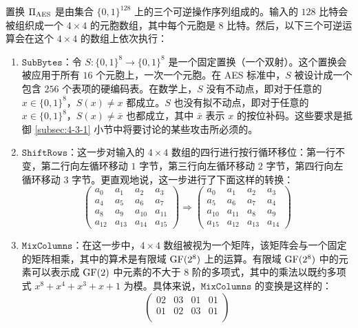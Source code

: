 \begin{snote}
置换 $\Pi_{\rm AES}$ 是由集合 $\{0,1\}^{128}$ 上的三个可逆操作序列组成的。输入的 $128$ 比特会被组织成一个 $4\times4$ 的元胞数组，其中每个元胞是 $8$ 比特。然后，以下三个可逆运算会在这个 $4\times4$ 的数组上依次执行：
\begin{enumerate}
	\item $\mathtt{SubBytes}$：令 $S:\{0,1\}^8\to\{0,1\}^8$ 是一个固定置换（一个双射）。这个置换会被应用于所有 $16$ 个元胞上，一次一个元胞。在 AES 标准中，$S$ 被设计成一个包含 $256$ 个表项的硬编码表。在数学上，$S$ 没有不动点，即对于任意的 $x\in\{0,1\}^8$，$S(x)\neq x$ 都成立。$S$ 也没有拟不动点，即对于任意的 $x\in\{0,1\}^8$，$S(x)\neq \bar x$ 也都成立，其中 $\bar x$ 表示 $x$ 的按位补码。这些要求是抵御 \ref{subsec:4-3-1} 小节中将要讨论的某些攻击所必须的。
	\item $\mathtt{ShiftRows}$：这一步对输入的 $4\times4$ 数组的四行进行按行循环移位：第一行不变，第二行向左循环移动 $1$ 字节，第三行向左循环移动 $2$ 字节，第四行向左循环移动 $3$ 字节。更直观地说，这一步进行了下面这样的转换：
	\begin{equation}\label{eq:4-11}
    \begin{pmatrix}
       a_0 & a_1 & a_2 & a_3\\
       a_4 & a_5 & a_6 & a_7\\
       a_8 & a_9 & a_{10} & a_{11}\\
       a_{12} & a_{13} & a_{14} & a_{15}
    \end{pmatrix}
    \Longrightarrow
    \begin{pmatrix}
       a_0 & a_1 & a_2 & a_3\\
       a_5 & a_6 & a_7 & a_4\\
       a_{10} & a_{11} & a_{8} & a_{9}\\
       a_{15} & a_{12} & a_{13} & a_{14}
    \end{pmatrix}
    \end{equation}
    \item $\mathtt{MixColumns}$：在这一步中，$4\times4$ 数组被视为一个矩阵，该矩阵会与一个固定的矩阵相乘，其中的算术是有限域 ${\rm GF}(2^8)$ 上的运算。有限域 ${\rm GF}(2^8)$ 中的元素可以表示成 ${\rm GF}(2)$ 中元素的不大于 $8$ 阶的多项式，其中的乘法以既约多项式 $x^8+x^4+x^3+x+1$ 为模。具体来说，$\mathtt{MixColumns}$ 的变换是这样的：
    \begin{equation}\label{eq:4-12}
    	\begin{pmatrix}	
    		02 & 03 & 01 & 01\\
    		01 & 02 & 03 & 01\\

\end{pmatrix}
\end{equation}
\end{enumerate}
\end{snote}
